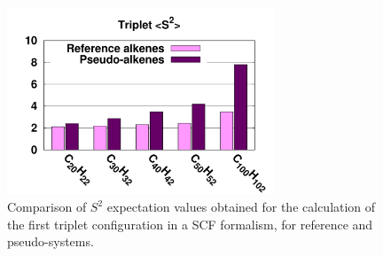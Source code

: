 \documentclass[12pt]{article}
\begin{document}
\begin{figure}
\begin{center}
\includegraphics[width=8cm]{long_pbe0_s2}
\end{center}
\vspace{0.25in}
\hspace*{3in}
\caption{Comparison of $S^2$ expectation values obtained for the calculation
of the first triplet configuration in a SCF formalism, for reference
and pseudo-systems.}
\label{fig:ssquare}
\end{figure}
\end{document}
